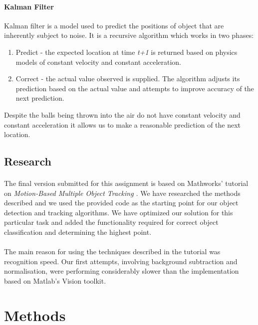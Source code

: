 \documentclass[10pt,a4paper]{article}
\begin{document}
\begin{multicols}{2}
\paragraph{Kalman Filter}
Kalman filter is a model used to predict the positions of object that are inherently subject to noise. It is a recursive algorithm which works in two phases:

\begin{enumerate}
\item Predict - the expected location at time \textit{t+1} is returned based on physics models of constant velocity and constant acceleration.
\item Correct - the actual value observed is supplied. The algorithm adjusts its prediction based on the actual value and attempts to improve accuracy of the next prediction.
\end{enumerate}

Despite the balls being thrown into the air do not have constant velocity and constant acceleration it allows us to make a reasonable prediction of the next location.

\subsection{Research}

\paragraph{} The final version submitted for this assignment is based on Mathworks' tutorial on {\itshape Motion-Based Multiple Object Tracking \cite{ES2}}. We have researched the methods described and we used the provided code as the starting point for our object detection and tracking algorithms. We have optimized our solution for this particular task and added the functionality required for correct object classification and determining the highest point.
\paragraph{}	The main reason for using the techniques described in the tutorial was recognition speed. Our first attempts, involving background subtraction and normalisation, were performing considerably slower than the implementation based on Matlab's Vision toolkit.

\end{multicols}

\section{Methods}
\end{document}

